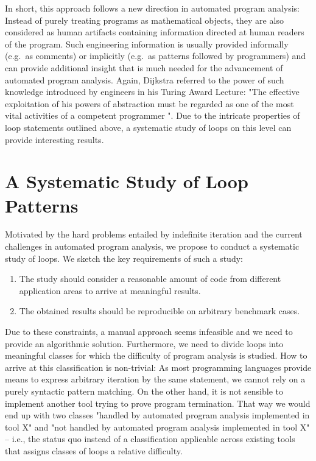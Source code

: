 In short, this approach follows a new direction in automated program analysis: Instead of purely treating programs as mathematical objects, they are also considered as human artifacts containing information directed at human readers of the program. Such engineering information is usually provided informally (e.g.\ as comments) or implicitly (e.g.\ as patterns followed by programmers) and can provide additional insight that is much needed for the advancement of automated program analysis. Again, Dijkstra referred to the power of such knowledge introduced by engineers in his Turing Award Lecture: "The effective exploitation of his powers of abstraction must be regarded as one of the most vital activities of a competent programmer \cite{DBLP:journals/cacm/Dijkstra72}". Due to the intricate properties of loop statements outlined above, a systematic study of loops on this level can provide interesting results.

\section{A Systematic Study of Loop Patterns}

Motivated by the hard problems entailed by indefinite iteration and the current challenges in automated program analysis, we propose to conduct a systematic study of loops. We sketch the key requirements of such a study:

\begin{enumerate}
    \item The study should consider a reasonable amount of code from different application areas to arrive at meaningful results.
    \item The obtained results should be reproducible on arbitrary benchmark cases.
\end{enumerate}

Due to these constraints, a manual approach seems infeasible and we need to provide an algorithmic solution. Furthermore, we need to divide loops into meaningful classes for which the difficulty of program analysis is studied. How to arrive at this classification is non-trivial: As most programming languages provide means to express arbitrary iteration by the same statement, we cannot rely on a purely syntactic pattern matching. On the other hand, it is not sensible to implement another tool trying to prove program termination. That way we would end up with two classes "handled by automated program analysis implemented in tool X" and "not handled by automated program analysis implemented in tool X" -- i.e., the status quo instead of a classification applicable across existing tools that assigns classes of loops a relative difficulty.

